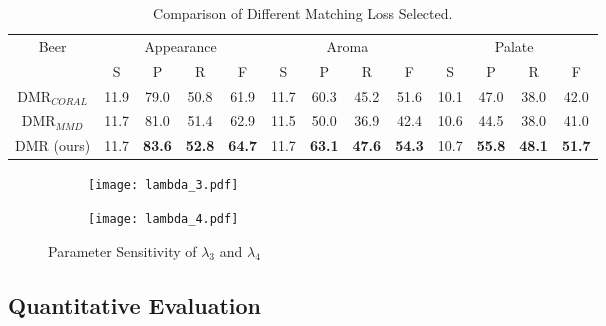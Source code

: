 \documentclass[letterpaper]{article} %
\begin{document}
\begin{table*}[]
    \centering
\small

\begin{tabular}{c|cccc|cccc|cccc}
\hline%
\multirow{2}{*}{Beer} & \multicolumn{4}{c|}{Appearance}                        & \multicolumn{4}{c|}{Aroma}                         & \multicolumn{4}{c}{Palate}                      \\
                      & S    & P             & R             & F             & S    & P             & R             & F             & S    & P             & R             & F             \\ \hline
DMR$_{CORAL}$                   & 11.9 & 79.0          & 50.8          & 61.9          & 11.7 & 60.3          & 45.2          & 51.6          & 10.1 & 47.0          & 38.0          & 42.0          \\
DMR$_{MMD}$                   & 11.7 & 81.0          & 51.4          & 62.9          & 11.5 & 50.0          & 36.9          & 42.4          & 10.6 & 44.5          & 38.0          & 41.0          \\
DMR (ours)                   & 11.7 & \textbf{83.6} & \textbf{52.8} & \textbf{64.7} & 11.7 & \textbf{63.1} & \textbf{47.6} & \textbf{54.3} & 10.7 & \textbf{55.8} & \textbf{48.1} & \textbf{51.7} \\\hline
\end{tabular}
\caption{\normalsize Comparison of Different Matching Loss Selected.}
    \label{tab:table_loss_sensitivity}
\end{table*}

\begin{figure}
    \centering
    \begin{subfigure}{0.4\textwidth}
    \texttt{[image: lambda\_3.pdf]}
    \caption{}
    \end{subfigure}
    \begin{subfigure}{0.4\textwidth}
    \texttt{[image: lambda\_4.pdf]}
    \caption{}
    \end{subfigure}
    \caption{Parameter Sensitivity of $\lambda_3$ and $\lambda_4$}
    \label{fig:lambdas_sensitivity}
\end{figure}


\subsection{Quantitative Evaluation}
\end{document}

